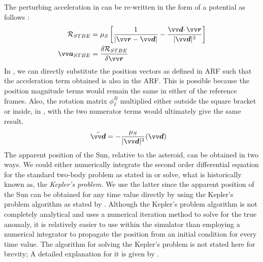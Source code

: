 The perturbing acceleration in  can be re-written in the form of a potential as follows \parencite{scheeresBook}:
\begin{align}
    \mathcal{R}_{STBE} &= \mu_S \left[\frac{1}{|\bv{r} - \bv{d}|} - \frac{\bv{d}\cdotp\bv{r}}{|\bv{d}|^3} \right]
    \label{eqn:stbe_potential} \\
    \bv{a}_{STBE} &= \frac{\delta \mathcal{R}_{STBE}}{\delta\bv{r}}
\end{align}
In , we can directly substitute the position vectors as defined in \gls{ARF} such that the acceleration term obtained is also in the \gls{ARF}. This is possible because the position magnitude terms would remain the same in either of the reference frames. Also, the rotation matrix $\phi_I^B$ multiplied either outside the square bracket or inside, in , with the two numerator terms would ultimately give the same result.
\begin{align}
    \ddot{\bv{d}} &= -\frac{\mu_S}{|\bv{d}|^3} (\bv{d})
    \label{eqn:sun_around_asteroid}
\end{align}
The apparent position of the Sun, relative to the asteroid, can be obtained in two ways. We could either numerically integrate the second order differential equation for the standard two-body problem as stated in  or solve, what is historically known as, the \textit{Kepler's problem}. We use the latter since the apparent position of the Sun can be obtained for any time value directly by using the Kepler's problem algorithm as stated by \cite{chobotovBook}. Although the Kepler's problem algorithm is not completely analytical and uses a numerical iteration method to solve for the true anomaly, it is relatively easier to use within the simulator than employing a numerical integrator to propagate the position from an initial condition for every time value. The algorithm for solving the Kepler's problem is not stated here for brevity; A detailed explanation for it is given by \cite{chobotovBook}.


